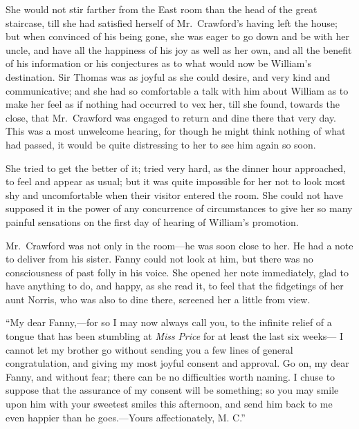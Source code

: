 She would not stir farther from the East room than
the head of the great staircase, till she had satisfied
herself of Mr.\ Crawford's having left the house;
but when convinced of his being gone, she was eager to go
down and be with her uncle, and have all the happiness
of his joy as well as her own, and all the benefit
of his information or his conjectures as to what would
now be William's destination.  Sir Thomas was as joyful
as she could desire, and very kind and communicative;
and she had so comfortable a talk with him about William
as to make her feel as if nothing had occurred to vex her,
till she found, towards the close, that Mr.\ Crawford
was engaged to return and dine there that very day.
This was a most unwelcome hearing, for though he might
think nothing of what had passed, it would be quite
distressing to her to see him again so soon.

She tried to get the better of it; tried very hard,
as the dinner hour approached, to feel and appear as usual;
but it was quite impossible for her not to look most shy
and uncomfortable when their visitor entered the room.
She could not have supposed it in the power of any concurrence
of circumstances to give her so many painful sensations on
the first day of hearing of William's promotion.

Mr.\ Crawford was not only in the room---he was soon close
to her.  He had a note to deliver from his sister.
Fanny could not look at him, but there was no consciousness
of past folly in his voice.  She opened her note immediately,
glad to have anything to do, and happy, as she read it,
to feel that the fidgetings of her aunt Norris, who was
also to dine there, screened her a little from view.

``My dear Fanny,---for so I may now always call you,
to the infinite relief of a tongue that has been stumbling
at \emph{Miss} \emph{Price} for at least the last six weeks---%
I cannot let my brother go without sending you a few lines
of general congratulation, and giving my most joyful consent
and approval.  Go on, my dear Fanny, and without fear;
there can be no difficulties worth naming.  I chuse to
suppose that the assurance of my consent will be something;
so you may smile upon him with your sweetest smiles
this afternoon, and send him back to me even happier
than he goes.---Yours affectionately, M. C.''

